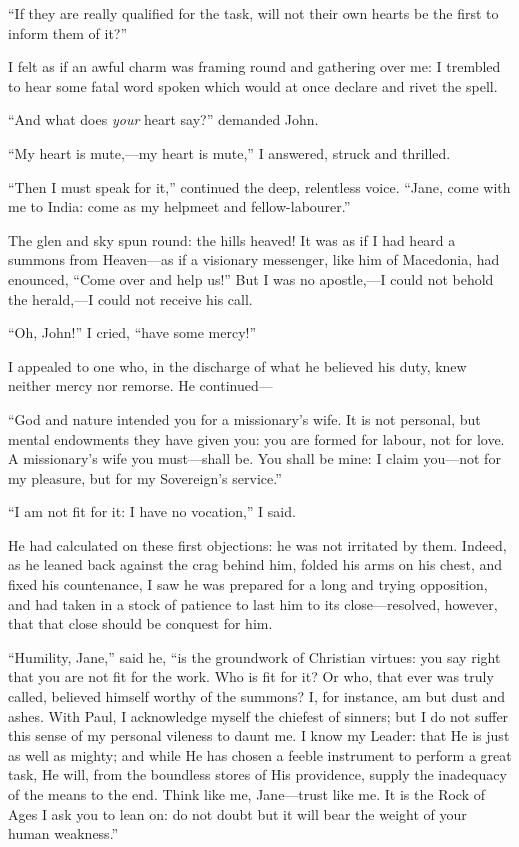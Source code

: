 \enquote{If they are really qualified for the task, will not their own
	hearts be the first to inform them of it?}

I felt as if an awful charm was framing round and gathering over me: I
trembled to hear some fatal word spoken which would at once declare and
rivet the spell.

\enquote{And what does \emph{your} heart say?} demanded \St{} John.

\enquote{My heart is mute,---my heart is mute,} I answered, struck and
thrilled.

\enquote{Then I must speak for it,} continued the deep, relentless
voice. \enquote{Jane, come with me to India: come as my helpmeet and
	fellow-labourer.}

The glen and sky spun round: the hills heaved! It was as if I had heard
a summons from Heaven---as if a visionary messenger, like him of
Macedonia, had enounced, \enquote{Come over and help us!} But I was no
apostle,---I could not behold the herald,---I could not receive his
call.

\enquote{Oh, \St{} John!} I cried, \enquote{have some mercy!}

I appealed to one who, in the discharge of what he believed his duty,
knew neither mercy nor remorse. He continued---

\enquote{God and nature intended you for a missionary's wife. It is not
	personal, but mental endowments they have given you: you are formed for
	labour, not for love. A missionary's wife you must---shall be. You
	shall be mine: I claim you---not for my pleasure, but for my Sovereign's
	service.}

\enquote{I am not fit for it: I have no vocation,} I said.

He had calculated on these first objections: he was not irritated by
them. Indeed, as he leaned back against the crag behind him, folded his
arms on his chest, and fixed his countenance, I saw he was prepared for
a long and trying opposition, and had taken in a stock of patience to
last him to its close---resolved, however, that that close should be
conquest for him.

\enquote{Humility, Jane,} said he, \enquote{is the groundwork of
	Christian virtues: you say right that you are not fit for the work. Who
	is fit for it? Or who, that ever was truly called, believed himself
	worthy of the summons? I, for instance, am but dust and ashes. With
	\St{} Paul, I acknowledge myself the chiefest of sinners; but I do not
	suffer this sense of my personal vileness to daunt me. I know my
	Leader: that He is just as well as mighty; and while He has chosen a
	feeble instrument to perform a great task, He will, from the boundless
	stores of His providence, supply the inadequacy of the means to the
	end. Think like me, Jane---trust like me. It is the Rock of Ages I ask
	you to lean on: do not doubt but it will bear the weight of your human
	weakness.}

